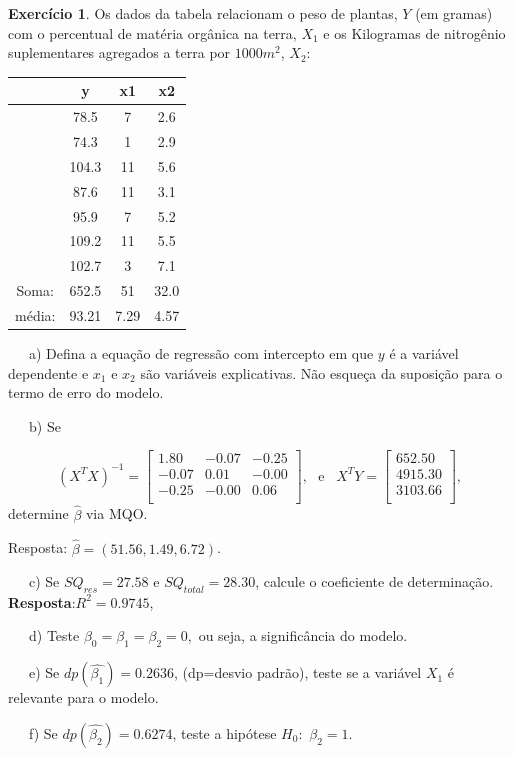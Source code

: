 \documentclass[
]{book}
\theoremstyle{definition}
\theoremstyle{definition}
\theoremstyle{definition}
\newtheorem{exercise}{Exercício}[chapter]
\theoremstyle{remark}
\begin{document}
\begin{exercise}
\protect\hypertarget{exr:exerint4}{}{\label{exr:exerint4} }Os dados da tabela relacionam o peso de plantas, \(Y\) (em gramas) com o percentual de matéria orgânica na terra, \(X_1\) e os Kilogramas de nitrogênio suplementares agregados a terra por \(1000 m^2\), \(X_2\):

\begin{center}
\begin{tabular}{cccc}
\hline
&y    & x1 & x2\\
\hline
&78.5 & 7  & 2.6\\
&74.3 & 1  & 2.9\\
&104.3& 11 & 5.6\\
&87.6 & 11 & 3.1\\
&95.9 & 7  & 5.2\\
&109.2& 11 & 5.5\\
&102.7& 3  &7.1\\
\hline
Soma:& 652.5& 51 &32.0\\
média:& 93.21 &7.29 &4.57\\
\hline
\end{tabular}
\end{center}

~~~a) Defina a equação de regressão com intercepto em que \(y\) é a variável dependente e \(x_1\) e \(x_2\) são variáveis explicativas. Não esqueça da suposição para o termo de erro do modelo.

~~~b) Se

\[(X^T X)^{-1}=\left[
\begin{array}{ccc}
1.80  &  -0.07  &  -0.25\\
-0.07 &  0.01   &  -0.00\\
-0.25 &  -0.00   &  0.06 \\
\end{array}
\right],\,\,\,\,\mbox{e}\,\,\,\,\,
X^T Y=\left[
\begin{array}{c}
652.50\\
4915.30\\
3103.66\\
\end{array}
\right],\]
determine \(\hat{{\beta}}\) via MQO.

Resposta: \(\hat{{\beta}}=(51.56,1.49,6.72)\).

~~~c) Se \(SQ_{res}=27.58\) e \(SQ_{total}=28.30\), calcule o coeficiente de determinação. \textbf{Resposta}:\(R^2=0.9745\),

~~~d) Teste \(\beta_0=\beta_1=\beta_2=0,\) ou seja, a significância do modelo.

~~~e) Se \(dp(\hat{\beta_1})=0.2636\), (dp=desvio padrão), teste se a variável \(X_1\) é relevante para o modelo.

~~~f) Se \(dp(\hat{\beta_2})=0.6274\), teste a hipótese \(H_0:\,\,\beta_2=1\).
\end{exercise}
\end{document}
